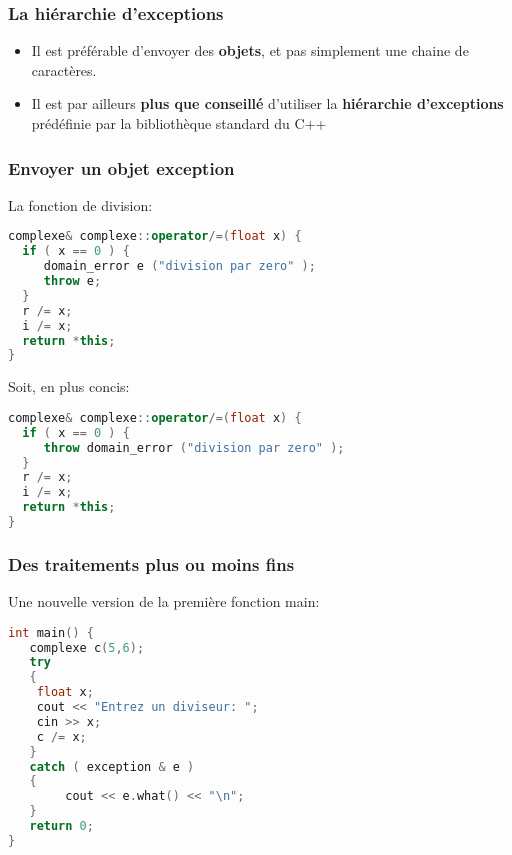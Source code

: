 \documentclass{beamer}
\begin{document}
\begin{frame}[fragile=singleslide,shrink=20]
\frametitle {La hiérarchie d'exceptions}

\begin{itemize}
\item{Il est préférable d'envoyer des \textbf{objets}, et pas simplement une chaine de caractères.}
\item{Il est par ailleurs \textbf{plus que conseillé} d'utiliser la \textbf{hiérarchie d'exceptions} prédéfinie par la bibliothèque standard du C++}
\end{itemize}

\begin{centering}%
%
\par%
\end{centering}%
\end{frame}

\begin{frame}[fragile=singleslide,shrink=20]
\frametitle {Envoyer un objet exception}

La fonction de division:
\begin{lstlisting}[language=c++]
complexe& complexe::operator/=(float x) {
  if ( x == 0 ) {
     domain_error e ("division par zero" );
     throw e;
  }
  r /= x;
  i /= x;
  return *this;
}
\end{lstlisting}

Soit, en plus concis:
\begin{lstlisting}[language=c++]
complexe& complexe::operator/=(float x) {
  if ( x == 0 ) {
     throw domain_error ("division par zero" );
  }
  r /= x;
  i /= x;
  return *this;
}
\end{lstlisting}
\end{frame}

\begin{frame}[fragile=singleslide,shrink=20]
\frametitle {Des traitements plus ou moins fins}

Une nouvelle version de la première fonction main:
\begin{lstlisting}[language=c++]
int main() {
   complexe c(5,6);
   try
   {
   	float x;
   	cout << "Entrez un diviseur: ";
	cin >> x;
	c /= x;
   }
   catch ( exception & e ) 
   {
    	cout << e.what() << "\n";
   }
   return 0;
}
\end{lstlisting}
\end{frame}
\end{document}
